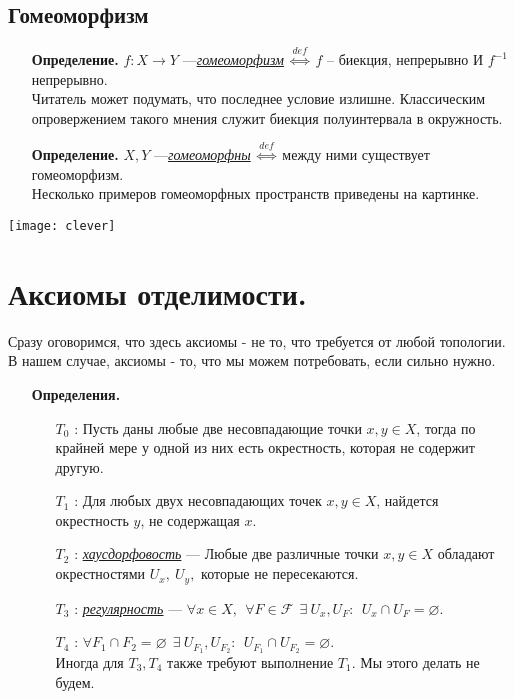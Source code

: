 \documentclass[10pt]{report}
\begin{document}
\begin{spacing}{1.5}
\subsection{Гомеоморфизм}
\begin{enumerate}
\item[\textbf{Определение.}]
$f:X\rightarrow Y$ ---\underline{\textit{гомеоморфизм}} $\overset{def}{\Longleftrightarrow}$ $f$ -- биекция, непрерывно И $f^{-1}$ непрерывно.\\
Читатель может подумать, что последнее условие излишне. Классическим опровержением такого мнения служит биекция полуинтервала в окружность.
\item[\textbf{Определение.}] $X, Y$ ---\underline{\textit{гомеоморфны}} $\overset{def}{\Longleftrightarrow}$ между ними существует гомеоморфизм.\\
Несколько примеров гомеоморфных пространств приведены на картинке.
\end{enumerate}




\texttt{[image: clever]}

\section{Аксиомы отделимости.}
Сразу оговоримся, что здесь аксиомы - не то, что требуется от любой топологии. В нашем случае, аксиомы - то, что мы можем потребовать, если сильно нужно.
\begin{enumerate}
\item[\textbf{Определения.}]
\begin{enumerate}
\item[\underline{$T_{0}$}]: Пусть даны любые две несовпадающие точки $x, y \in X$, тогда по крайней мере у одной из них есть окрестность, которая не содержит другую.
\item[\underline{$T_{1}$}]: Для любых двух несовпадающих точек $x, y \in X$, найдется окрестность $y$, не содержащая $x$.
\item[\underline{$T_{2}$}]: \underline{\emph{хаусдорфовость}} ---  Любые две различные точки $x, y \in X$ обладают окрестностями $U_{x},~U_{y},$ которые не пересекаются.
\item[\underline{$T_{3}$}]: \underline{\textit{регулярность}} --- $\forall x\in X,~~\forall F\in\mathcal{F}~~\exists~U_{x}, U_{F}:~~U_{x}\cap U_{F} = \varnothing.$
\item[\underline{$T_{4}$}]: $\forall F_{1}\cap F_{2}=\varnothing~~\exists~U_{F_{1}}, U_{F_{2}}:~~U_{F_{1}}\cap U_{F_{2}} = \varnothing.$\\
Иногда для $T_{3}, T_{4}$ также требуют выполнение $T_{1}$. Мы этого делать не будем.
\end{enumerate}
\end{enumerate}



 \end{spacing}
 
\end{document}
